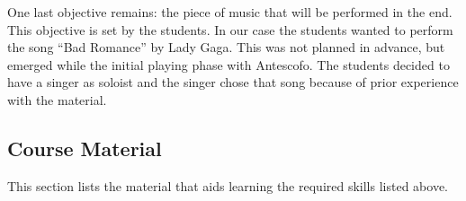 \documentclass[onecolumn,nocopyrightspace,preprint]{sigplanconf}
\begin{document}
One last objective remains: the piece of music that will be performed in the
end. This objective is set by the students. In our case the students wanted to
perform the song ``Bad Romance'' by Lady Gaga. This was not planned in
advance, but emerged while the initial playing phase with Antescofo. The
students decided to have a singer as soloist and the singer chose that song
because of prior experience with the material.



\subsection{Course Material}\label{sec:material}


This section lists the material that aids learning the required skills listed above.
\end{document}
